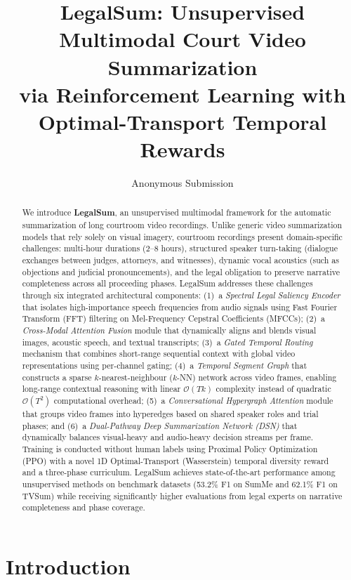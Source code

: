 \documentclass[letterpaper]{article}
\title{LegalSum: Unsupervised Multimodal Court Video Summarization\\
       via Reinforcement Learning with Optimal-Transport Temporal Rewards}
\author{Anonymous Submission}
\begin{document}
\maketitle

\begin{abstract}
We introduce \textbf{LegalSum}, an unsupervised multimodal framework for the automatic summarization of long courtroom video recordings. Unlike generic video summarization models that rely solely on visual imagery, courtroom recordings present domain-specific challenges: multi-hour durations ($2$--$8$ hours), structured speaker turn-taking (dialogue exchanges between judges, attorneys, and witnesses), dynamic vocal acoustics (such as objections and judicial pronouncements), and the legal obligation to preserve narrative completeness across all proceeding phases. LegalSum addresses these challenges through six integrated architectural components: (1)~a \textit{Spectral Legal Saliency Encoder} that isolates high-importance speech frequencies from audio signals using Fast Fourier Transform (FFT) filtering on Mel-Frequency Cepstral Coefficients (MFCCs); (2)~a \textit{Cross-Modal Attention Fusion} module that dynamically aligns and blends visual images, acoustic speech, and textual transcripts; (3)~a \textit{Gated Temporal Routing} mechanism that combines short-range sequential context with global video representations using per-channel gating; (4)~a \textit{Temporal Segment Graph} that constructs a sparse $k$-nearest-neighbour ($k$-NN) network across video frames, enabling long-range contextual reasoning with linear $\mathcal{O}(Tk)$ complexity instead of quadratic $\mathcal{O}(T^2)$ computational overhead; (5)~a \textit{Conversational Hypergraph Attention} module that groups video frames into hyperedges based on shared speaker roles and trial phases; and (6)~a \textit{Dual-Pathway Deep Summarization Network (DSN)} that dynamically balances visual-heavy and audio-heavy decision streams per frame. Training is conducted without human labels using Proximal Policy Optimization (PPO) with a novel 1D Optimal-Transport (Wasserstein) temporal diversity reward and a three-phase curriculum. LegalSum achieves state-of-the-art performance among unsupervised methods on benchmark datasets (53.2\% F1 on SumMe and 62.1\% F1 on TVSum) while receiving significantly higher evaluations from legal experts on narrative completeness and phase coverage.
\end{abstract}

\section{Introduction}
\end{document}
